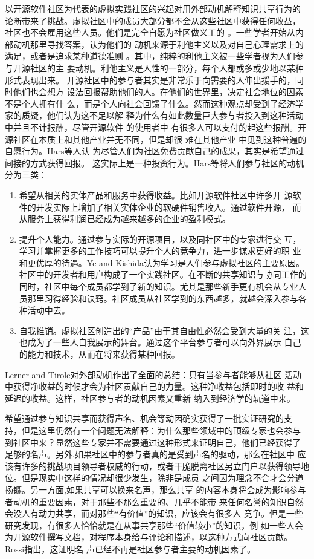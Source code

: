 \documentclass[12pt,a4paper,cs4size]{ctexart}
\begin{document}
以开源软件社区为代表的虚拟实践社区的兴起对用外部动机解释知识共享行为的
论断带来了挑战。虚拟社区中的成员大部分都不会从这些社区中获得任何收益，
社区也不会雇用这些人员。他们是完全自愿为社区做义工的
\cite{lerner2002sse}。一些学者开始从内部动机那里寻找答案，认为他们的
动机来源于利他主义以及对自己心理需求上的满足，或者是追求某种道德准则
\cite{Wu2007}。其中，纯粹的利他主义被一些学者视为人们参与开源社区的主
要动机。利他主义是人性的一部分，每个人都或多或少地以某种形式表现出来。
开源社区中的参与者其实是非常乐于向需要的人伸出援手的，同时他们也会想方
设法回报帮助他们的人。在他们的世界里，决定社会地位的因素不是个人拥有什
么，而是个人向社会回馈了什么\cite{raymond1999cab}。然而这种观点却受到了经济学家的质疑，他们认为这不足以解
释为什么有如此数量巨大参与者投入到这种活动中并且不计报酬，尽管开源软件
的使用者中
有很多人可以支付的起这些报酬。开源社区在本质上和其他产业并无不同，但是却很
难在其他产业 中见到这种普遍的自愿行为\cite{schmidt2002pso}。Hars等人认
为尽管人们为社区免费贡献自己的成果，其实是希望通过间接的方式获得回报。
这实际上是一种投资行为\cite{hars2002wfm}。Hars等将人们参与社区的动机分为三类：
\begin{enumerate}
\item  希望从相关的实体产品和服务中获得收益。比如开源软件社区中许多开
  源软件的开发实际上增加了相关实体企业的软硬件销售收入。通过软件开源，
  而从服务上获得利润已经成为越来越多的企业的盈利模式。
\item 提升个人能力。通过参与实际的开源项目，以及同社区中的专家进行交
  互，学习并掌握更多的工作技巧可以提升个人的竞争力，进一步谋求更好的职
  业和更优厚的待遇。Ye and Kishida认为学习是人们参与虚拟社区的主要原因。
  社区中的开发者和用户构成了一个实践社区。在不断的共享知识与协同工作的
  同时，社区中每个成员都学到了新的知识。尤其是那些新手更有机会从专业人
  员那里习得经验和诀窍。社区成员从社区学到的东西越多，就越会深入参与各
  种活动中去\cite{1201220}。
\item 自我推销。虚拟社区创造出的“产品”由于其自由性必然会受到大量的关
  注，这也成为了一些人自我展示的舞台。通过这个平台参与者可以向外界展示
  自己的能力和技术，从而在将来获得某种回报。
\end{enumerate}
Lerner and Tirole对外部动机作出了全面的总结：只有当参与者能够从社区
活动中获得净收益的时候才会为社区贡献自己的力量。这种净收益包括即时的收
益和延迟的收益\cite{lerner2002sse}。这样，社区参与者的动机因素又重新
纳入到经济学的轨道中来。

希望通过参与知识共享而获得声名、机会等动因确实获得了一批实证研究的支
持，但是这里仍然有一个问题无法解释：为什么那些领域中的顶级专家也会参与
到社区中来？显然这些专家并不需要通过这种形式来证明自己，他们已经获得了
足够的名声。另外,如果社区中的参与者真的是受到声名的驱动，那么在社区中
应该有许多的挑战项目领导者权威的行动，或者干脆脱离社区另立门户以获得领导地
位\cite{WeberWeberSteven}。但是现实中这样的情况却很少发生，除非是成员
之间因为理念不合才会分道扬镳。另一方面,如果共享可以换来名声，那么共享
的内容本身将会成为影响参与者动机的重要因素，对于那些不那么重要的、几乎不能带
来任何名誉的知识自然会没人有动力共享，而对那些“有价值”的知识，应该会有很多人
竞争。但是一些研究发现，有很多人恰恰就是在从事共享那些“价值较小”的知识，例
如一些人会为开源软件撰写文档，对程序本身给与评论和描述，以这种方式向社区贡献。Rossi指出，这证明名
声已经不再是社区参与者主要的动机因素了\cite{Rossi2004}。
\end{document}
